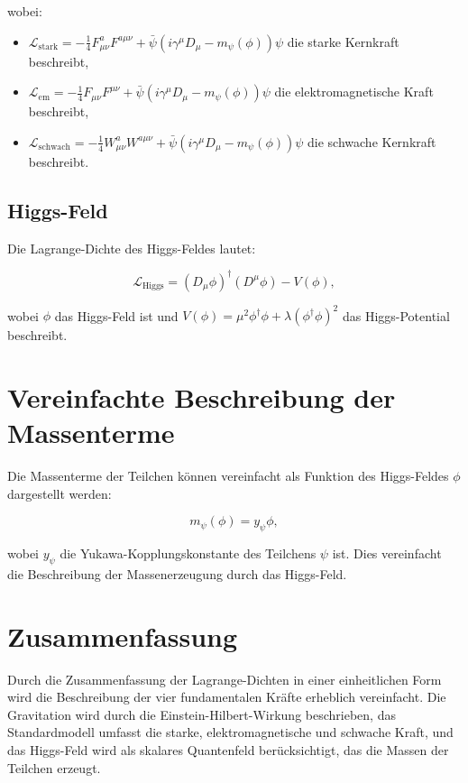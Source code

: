\documentclass{article}
\begin{document}
	wobei:
	\begin{itemize}
		\item $\mathcal{L}_\text{stark} = -\frac{1}{4} F_{\mu\nu}^a F^{a\mu\nu} + \bar{\psi}(i \gamma^\mu D_\mu - m_\psi(\phi))\psi$ die starke Kernkraft beschreibt,
		\item $\mathcal{L}_\text{em} = -\frac{1}{4} F_{\mu\nu} F^{\mu\nu} + \bar{\psi}(i \gamma^\mu D_\mu - m_\psi(\phi))\psi$ die elektromagnetische Kraft beschreibt,
		\item $\mathcal{L}_\text{schwach} = -\frac{1}{4} W_{\mu\nu}^a W^{a\mu\nu} + \bar{\psi}(i \gamma^\mu D_\mu - m_\psi(\phi))\psi$ die schwache Kernkraft beschreibt.
	\end{itemize}
	
	\subsection{Higgs-Feld}
	Die Lagrange-Dichte des Higgs-Feldes lautet:
	
	\begin{equation}
		\mathcal{L}_\text{Higgs} = (D_\mu \phi)^\dagger (D^\mu \phi) - V(\phi),
	\end{equation}
	
	wobei $\phi$ das Higgs-Feld ist und $V(\phi) = \mu^2 \phi^\dagger \phi + \lambda (\phi^\dagger \phi)^2$ das Higgs-Potential beschreibt.
	
	\section{Vereinfachte Beschreibung der Massenterme}
	
	Die Massenterme der Teilchen können vereinfacht als Funktion des Higgs-Feldes $\phi$ dargestellt werden:
	
	\begin{equation}
		m_\psi(\phi) = y_\psi \phi,
	\end{equation}
	
	wobei $y_\psi$ die Yukawa-Kopplungskonstante des Teilchens $\psi$ ist. Dies vereinfacht die Beschreibung der Massenerzeugung durch das Higgs-Feld.
	
	\section{Zusammenfassung}
	
	Durch die Zusammenfassung der Lagrange-Dichten in einer einheitlichen Form wird die Beschreibung der vier fundamentalen Kräfte erheblich vereinfacht. Die Gravitation wird durch die Einstein-Hilbert-Wirkung beschrieben, das Standardmodell umfasst die starke, elektromagnetische und schwache Kraft, und das Higgs-Feld wird als skalares Quantenfeld berücksichtigt, das die Massen der Teilchen erzeugt.
\end{document}
